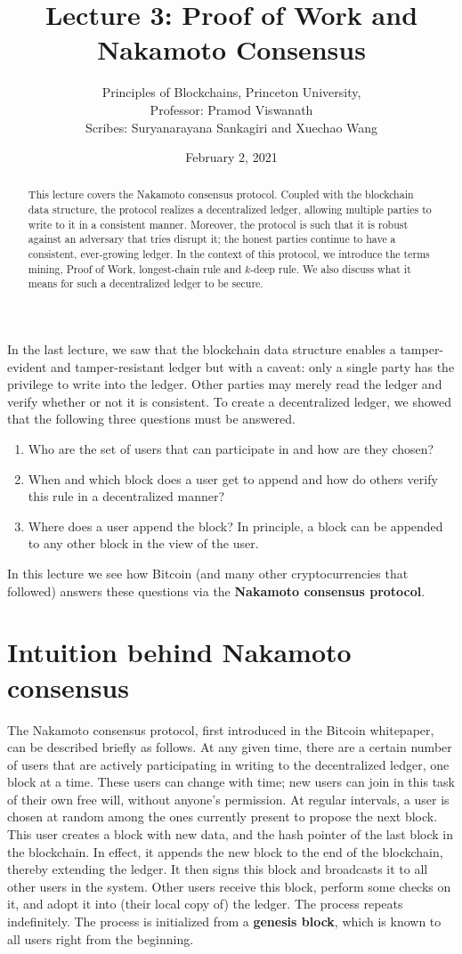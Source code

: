\documentclass{article}
\title{Lecture 3:  Proof of Work and Nakamoto Consensus}
\author{Principles of Blockchains, Princeton University,  \\ Professor:  Pramod Viswanath \\ Scribes: Suryanarayana Sankagiri and Xuechao Wang}
\date{February 2, 2021}
\begin{document}
\maketitle

\begin{abstract} This lecture covers the {Nakamoto consensus protocol}. Coupled with the blockchain data structure, the protocol realizes a decentralized ledger, allowing multiple parties to write to it in a consistent manner. Moreover, the protocol is such that it is robust against an adversary that tries disrupt it; the honest parties continue to have a consistent, ever-growing ledger. In the context of this protocol, we introduce the terms {mining}, {Proof of Work}, {longest-chain rule} and {$k$-deep rule}. We also discuss what it means for such a decentralized ledger to be secure.
\end{abstract}

In the last lecture, we saw that the blockchain data structure enables a tamper-evident and tamper-resistant ledger but with a caveat: only a single party has the privilege to write into the ledger. Other parties may merely read the ledger and verify whether or not it is consistent. To create a decentralized ledger, we showed that the following three questions must be answered.
\begin{enumerate}
    \item Who are the set of users that can participate in and how are they chosen? 
    \item When and which block does a user get to append and how do others verify this rule in a decentralized manner?
    \item Where does a user append the block? In principle, a block can be appended to any other block in the view of the user. 
\end{enumerate}
In this lecture we see how Bitcoin (and many other cryptocurrencies that followed) answers these questions via the \textbf{Nakamoto consensus protocol}.

\section*{Intuition behind Nakamoto consensus}
The Nakamoto consensus protocol, first introduced in the Bitcoin whitepaper, can be described briefly as follows. At any given time, there are a certain number of users that are actively participating in writing to the decentralized ledger, one block at a time. These users can change with time; new users can join in this task of their own free will, without anyone's permission. At regular intervals, a user is chosen at random among the ones currently present to propose the next block. This user creates a block with new data, and the hash pointer of the last block in the blockchain. In effect, it appends the new block to the end of the blockchain, thereby extending the ledger. It then signs this block and broadcasts it to all other users in the system. Other users receive this block, perform some checks on it, and adopt it into (their local copy of) the ledger. The process repeats indefinitely. The process is initialized from a \textbf{genesis block}, which is known to all users right from the beginning.
\end{document}
